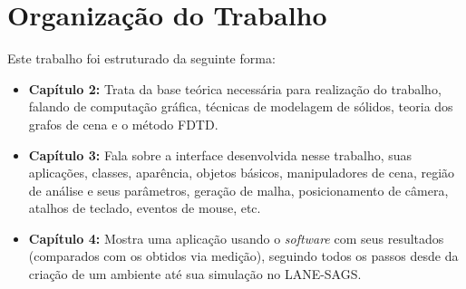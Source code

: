\section{Organização do Trabalho}
	Este trabalho foi estruturado da seguinte forma:
\begin{itemize}
\item \textbf{Capítulo 2:} Trata da base teórica necessária para realização do trabalho, falando de computação gráfica, técnicas de modelagem de sólidos, teoria dos grafos de cena e o método FDTD.
\item \textbf{Capítulo 3:} Fala sobre a interface desenvolvida nesse trabalho, suas aplicações, classes, aparência, objetos básicos, manipuladores de cena, região de análise e seus parâmetros, geração de malha, posicionamento de câmera, atalhos de teclado, eventos de mouse, etc. 
\item \textbf{Capítulo 4:} Mostra uma aplicação usando o \textit{software} com seus resultados (comparados com os obtidos via medição), seguindo todos os passos desde da criação de um ambiente até sua simulação no LANE-SAGS.
\end{itemize}
